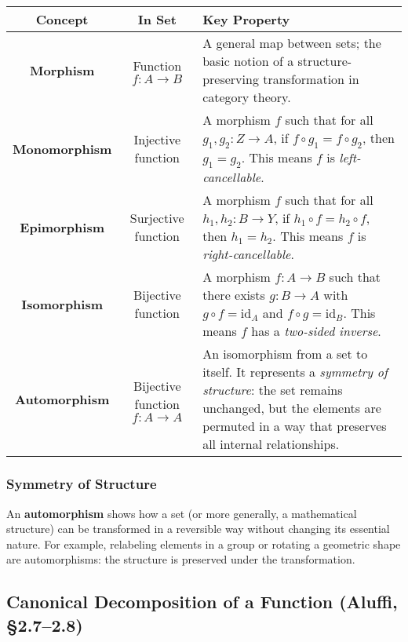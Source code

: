 \documentclass[10pt]{article}
\theoremstyle{plain}
\theoremstyle{definition}
\begin{document}
\begin{center}
	\renewcommand{\arraystretch}{1.4}
	\begin{tabular}{|c|c|p{7cm}|}
		\hline
		\textbf{Concept} & \textbf{In \textbf{Set}} & \textbf{Key Property} \\
		\hline
		\textbf{Morphism} & Function \( f : A \to B \) & A general map between sets; the basic notion of a structure-preserving transformation in category theory. \\
		\hline
		\textbf{Monomorphism} & Injective function & A morphism \( f \) such that for all \( g_1, g_2 : Z \to A \), if \( f \circ g_1 = f \circ g_2 \), then \( g_1 = g_2 \). This means \( f \) is \emph{left-cancellable}. \\
		\hline
		\textbf{Epimorphism} & Surjective function & A morphism \( f \) such that for all \( h_1, h_2 : B \to Y \), if \( h_1 \circ f = h_2 \circ f \), then \( h_1 = h_2 \). This means \( f \) is \emph{right-cancellable}. \\
		\hline
		\textbf{Isomorphism} & Bijective function & A morphism \( f : A \to B \) such that there exists \( g : B \to A \) with \( g \circ f = \text{id}_A \) and \( f \circ g = \text{id}_B \). This means \( f \) has a \emph{two-sided inverse}. \\
		\hline
		\textbf{Automorphism} & Bijective function \( f : A \to A \) & An isomorphism from a set to itself. It represents a \emph{symmetry of structure}: the set remains unchanged, but the elements are permuted in a way that preserves all internal relationships. \\
		\hline
	\end{tabular}
\end{center}

\subsubsection*{Symmetry of Structure}
An \textbf{automorphism} shows how a set (or more generally, a mathematical structure) can be transformed in a reversible way without changing its essential nature. For example, relabeling elements in a group or rotating a geometric shape are automorphisms: the structure is preserved under the transformation.

\subsection*{Canonical Decomposition of a Function (Aluffi, §2.7–2.8)}
\end{document}
